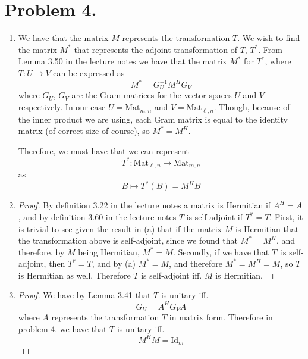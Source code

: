 \documentclass[a4paper,11pt]{article}
\begin{document}
\section*{Problem 4.}
\begin{enumerate}
    \item
        We have that the matrix $M$ represents the transformation $T$. We wish to find the matrix $M^*$ that 
        represents the adjoint transformation of $T$, $T^*$. From Lemma 3.50 in the lecture notes we have that
        the matrix $M^*$ for $T^*$, where $T : U \to V$ can be expressed as
        \[
            M^* = G_U^{-1} M^H G_V
        \]
        where $G_U$, $G_V$ are the Gram matrices for the vector spaces $U$ and $V$ respectively.
        In our case $U = \text{Mat}_{m, n}$ and $V = \text{Mat}_{\ell, n}$. Though, because of the 
        inner product we are using, each Gram matrix is equal to the identity matrix (of correct size of course), so
        $M^* = M^H$.

        Therefore, we must have that we can represent
        \[
            T^* : \text{Mat}_{\ell, n} \to \text{Mat}_{m, n}
        \]
        as
        \[
            B \mapsto T^*(B) = M^H B
        \]
    \item 
        \begin{proof}
        By definition 3.22 in the lecture notes a matrix is Hermitian if $A^H = A$, and by
        definition 3.60 in the lecture notes $T$ is self-adjoint if $T^* = T$.
        First, it is trivial to see given the result in (a) that if the matrix $M$ is Hermitian that the transformation above is 
        self-adjoint, since we found that $M^* = M^H$, and therefore, by $M$ being Hermitian, $M^* = M$.
        Secondly, if we have that $T$ is self-adjoint, then $T^* = T$, and by (a) $M^* = M$, and therefore 
        $M^* = M^H = M$, so $T$ is Hermitian as well. Therefore $T$ is self-adjoint iff. $M$ is Hermitian.
        \end{proof}
    \item \begin{proof} 
        We have by Lemma 3.41 that 
        $T$ is unitary iff. 
        \[
            G_U = A^HG_VA
        \]
        where $A$ represents the transformation $T$ in matrix form. Therefore in problem 4. we have that 
        $T$ is unitary iff.
        \[
            M^H M = \text{Id}_m
        \]
        \end{proof}
\end{enumerate}
\end{document}
